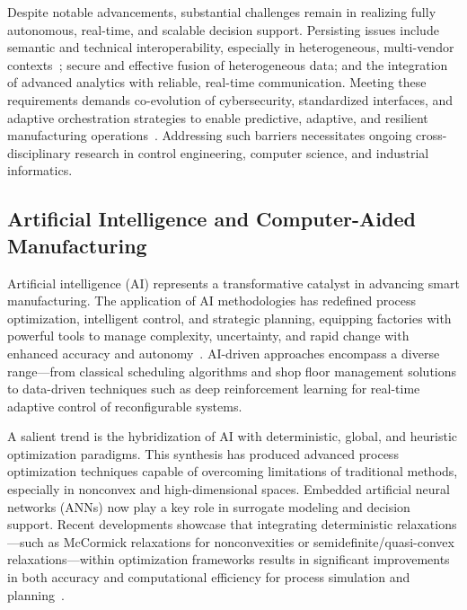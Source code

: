Despite notable advancements, substantial challenges remain in realizing fully autonomous, real-time, and scalable decision support. Persisting issues include semantic and technical interoperability, especially in heterogeneous, multi-vendor contexts~\cite{ref25}; secure and effective fusion of heterogeneous data; and the integration of advanced analytics with reliable, real-time communication. Meeting these requirements demands co-evolution of cybersecurity, standardized interfaces, and adaptive orchestration strategies to enable predictive, adaptive, and resilient manufacturing operations~\cite{ref4,ref91}. Addressing such barriers necessitates ongoing cross-disciplinary research in control engineering, computer science, and industrial informatics.

\subsection{Artificial Intelligence and Computer-Aided Manufacturing}

Artificial intelligence (AI) represents a transformative catalyst in advancing smart manufacturing. The application of AI methodologies has redefined process optimization, intelligent control, and strategic planning, equipping factories with powerful tools to manage complexity, uncertainty, and rapid change with enhanced accuracy and autonomy~\cite{ref2,ref6,ref13,ref14,ref19,ref20,ref27,ref30,ref37,ref38,ref41,ref42,ref44,ref45,ref50,ref52,ref56,ref72,ref91}. AI-driven approaches encompass a diverse range—from classical scheduling algorithms and shop floor management solutions to data-driven techniques such as deep reinforcement learning for real-time adaptive control of reconfigurable systems.

A salient trend is the hybridization of AI with deterministic, global, and heuristic optimization paradigms. This synthesis has produced advanced process optimization techniques capable of overcoming limitations of traditional methods, especially in nonconvex and high-dimensional spaces. Embedded artificial neural networks (ANNs) now play a key role in surrogate modeling and decision support. Recent developments showcase that integrating deterministic relaxations—such as McCormick relaxations for nonconvexities or semidefinite/quasi-convex relaxations—within optimization frameworks results in significant improvements in both accuracy and computational efficiency for process simulation and planning~\cite{ref71,ref72,ref73,ref76,ref78}.

